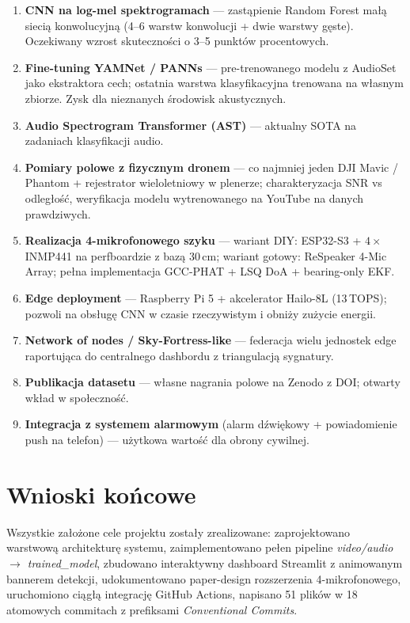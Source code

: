 \documentclass[11pt,a4paper]{article}
\begin{document}
\begin{enumerate}[label=\textbf{\arabic*.},leftmargin=*]
  \item \textbf{CNN na log-mel spektrogramach} --- zastąpienie Random Forest
        małą siecią konwolucyjną (4--6 warstw konwolucji + dwie warstwy
        gęste). Oczekiwany wzrost skuteczności o 3--5 punktów procentowych.
  \item \textbf{Fine-tuning YAMNet / PANNs} --- pre-trenowanego modelu
        z AudioSet \cite{yamnet} jako ekstraktora cech; ostatnia warstwa
        klasyfikacyjna trenowana na własnym zbiorze. Zysk dla nieznanych
        środowisk akustycznych.
  \item \textbf{Audio Spectrogram Transformer (AST)} \cite{ast} --- aktualny
        SOTA na zadaniach klasyfikacji audio.
  \item \textbf{Pomiary polowe z fizycznym dronem} --- co najmniej jeden
        DJI Mavic / Phantom + rejestrator wieloletnio\-wy w plenerze;
        charakteryzacja SNR vs odległość, weryfikacja modelu wytre\-no\-wanego
        na YouTube na danych prawdziwych.
  \item \textbf{Realizacja 4-mikrofonowego szyku} --- wariant DIY:
        ESP32-S3 + $4 \times$ INMP441 na perfboardzie z bazą 30\,cm;
        wariant gotowy: ReSpeaker 4-Mic Array; pełna implementacja
        GCC-PHAT + LSQ DoA + bearing-only EKF.
  \item \textbf{Edge deployment} --- Raspberry Pi 5 + akcelerator
        Hailo-8L (13\,TOPS); pozwoli na obsługę CNN w czasie rzeczywistym
        i obniży zużycie energii.
  \item \textbf{Network of nodes / Sky-Fortress-like} --- federacja
        wielu jednostek edge raportująca do centralnego dashbordu z
        triangulacją sygnatury.
  \item \textbf{Publikacja datasetu} --- własne nagrania polowe na
        Zenodo z DOI; otwarty wkład w społeczność.
  \item \textbf{Integracja z systemem alarmowym} (alarm dźwiękowy +
        powiadomienie push na telefon) --- użytkowa wartość dla obrony
        cywilnej.
\end{enumerate}

\section{Wnioski końcowe}

Wszystkie założone cele projektu zostały zrealizowane: zaprojektowano
warstwową architekturę systemu, zaimplementowano pełen pipeline
\emph{video/audio $\to$ trained\_model}, zbudowano interaktywny dashboard
Streamlit z animowanym bannerem detekcji, udokumentowano paper-design
rozszerzenia 4-mikrofonowego, uruchomiono ciągłą integrację GitHub Actions,
napisano 51 plików w 18 atomowych commitach z prefiksami \emph{Conventional
Commits}.
\end{document}
